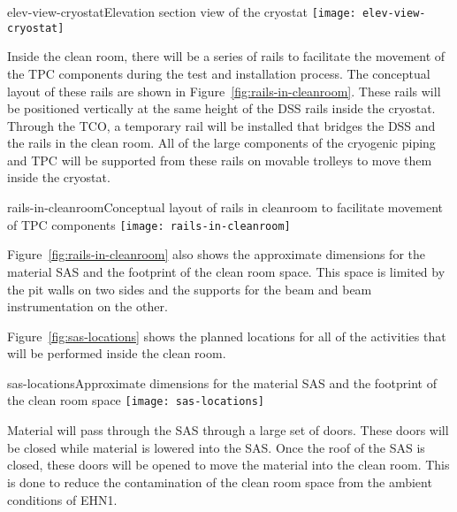 \begin{cdrfigure}{elev-view-cryostat}{Elevation section view of the cryostat}
\texttt{[image: elev-view-cryostat]}
\end{cdrfigure}


Inside the clean room, there will be a series of rails to facilitate the movement of the TPC components during the test and installation process.  The conceptual layout of these rails are shown in Figure~\ref{fig:rails-in-cleanroom}.  These rails will be positioned vertically at the same height of the DSS rails inside the cryostat.  Through the TCO, a temporary rail will be installed that bridges the DSS and the rails in the clean room.  All of the large components of the cryogenic piping and TPC will be supported from these rails on movable trolleys to move them inside the cryostat.  

\begin{cdrfigure}{rails-in-cleanroom}{Conceptual layout of rails in cleanroom to facilitate movement of TPC components}
\texttt{[image: rails-in-cleanroom]}
\end{cdrfigure}


Figure~\ref{fig:rails-in-cleanroom} also shows the approximate dimensions for the material SAS and the footprint of the clean room space.  This space is limited by the pit walls on two sides and the supports for the beam and beam instrumentation on the other.  

Figure~\ref{fig:sas-locations} shows the planned locations for all of the activities that will be performed inside the clean room.  

\begin{cdrfigure}{sas-locations}{Approximate dimensions for the material SAS and the footprint of the clean room space}
\texttt{[image: sas-locations]}
\end{cdrfigure}


Material will pass through the SAS through a large set of doors.  These doors will be closed while material is lowered into the SAS.  Once the roof of the SAS is closed, these doors will be opened to move the material into the clean room.  This is done to reduce the contamination of the clean room space from the ambient conditions of EHN1.  


